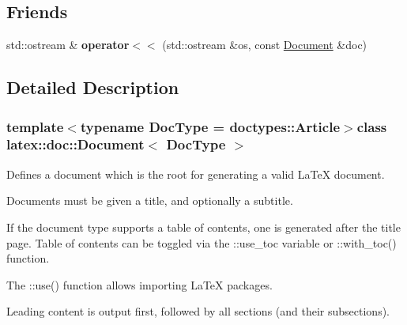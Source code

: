 \subsection*{Friends}
\begin{DoxyCompactItemize}
\item 
\hypertarget{classlatex_1_1doc_1_1Document_a278308e5ad27667f48b2daf57dd1b254}{std\-::ostream \& {\bfseries operator$<$$<$} (std\-::ostream \&os, const \hyperlink{classlatex_1_1doc_1_1Document}{Document} \&doc)}\label{classlatex_1_1doc_1_1Document_a278308e5ad27667f48b2daf57dd1b254}

\end{DoxyCompactItemize}


\subsection{Detailed Description}
\subsubsection*{template$<$typename Doc\-Type = doctypes\-::\-Article$>$class latex\-::doc\-::\-Document$<$ Doc\-Type $>$}

Defines a document which is the root for generating a valid La\-Te\-X document.

Documents must be given a title, and optionally a subtitle.

If the document type supports a table of contents, one is generated after the title page. Table of contents can be toggled via the {\ttfamily \-::use\-\_\-toc} variable or {\ttfamily \-::with\-\_\-toc()} function.

The {\ttfamily \-::use()} function allows importing La\-Te\-X packages.

Leading content is output first, followed by all sections (and their subsections). 

